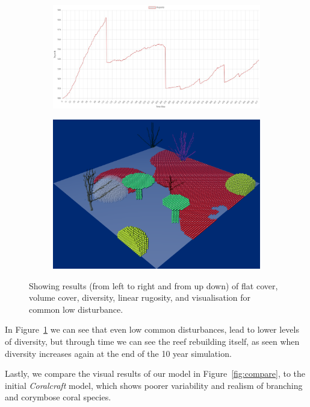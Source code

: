 \documentclass[9pt]{pnas-new}
\begin{document}
\begin{figure}[H]
        \begin{subfigure}{0.35\textwidth}
        \includegraphics[width=\textwidth]{fig/low_chart_rugosity.jpg}
    \end{subfigure}
        \begin{subfigure}{0.25\textwidth}
        \includegraphics[width=\textwidth]{fig/low_final.png}
    \end{subfigure}
    \caption{Showing results (from left to right and from up down) of flat cover, volume cover, diversity, linear rugosity, and visualisation for common low disturbance.}
    \label{fig:low_common}
\end{figure}

In Figure~\ref{fig:low_common} we can see that even low common disturbances, lead to lower levels of diversity, but through time we can see the reef rebuilding itself, as seen when diversity increases again at the end of the 10 year simulation.

Lastly, we compare the visual results of our model in Figure~\ref{fig:compare}, to the initial \textit{Coralcraft} model, which shows poorer variability and realism of branching and corymbose coral species.
\end{document}

